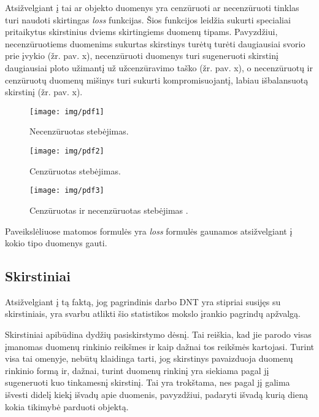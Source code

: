 \documentclass{VUMIFPSkursinis}
\begin{document}
Atsižvelgiant į tai ar objekto duomenys yra cenzūruoti ar necenzūruoti tinklas turi naudoti skirtingas \textit{loss} funkcijas. Šios funkcijos leidžia sukurti specialiai pritaikytus skirstinius dviems skirtingiems duomenų tipams. Pavyzdžiui, necenzūruotiems duomenims sukurtas skirstinys turėtų turėti daugiausiai svorio prie įvykio (žr. pav. x), necenzūruoti duomenys turi sugeneruoti skirstinį daugiausiai ploto užimantį už užcenzūravimo taško (žr. pav. x), o necenzūruotų ir cenzūruotų duomenų mišinys turi sukurti kompromisuojantį, labiau išbalansuotą skirstinį (žr. pav. x).  

\begin{figure}[H]
  \centering
  \texttt{[image: img/pdf1]}
  \caption{ Necenzūruotas stebėjimas\cite{WTTEBLOG}.}
  \label{img:pdf1}
\end{figure}


\begin{figure}[H]
  \centering
  \texttt{[image: img/pdf2]}
  \caption{ Cenzūruotas stebėjimas\cite{WTTEBLOG}.}
  \label{img:pdf2}
\end{figure}


\begin{figure}[H]
  \centering
  \texttt{[image: img/pdf3]}
  \caption{ Cenzūruotas ir necenzūruotas stebėjimas \cite{WTTEBLOG}.}
  \label{img:pdf3}
\end{figure}

Paveikslėliuose matomos formulės yra \textit{loss} formulės gaunamos atsižvelgiant į kokio tipo duomenys gauti. 



\subsection{Skirstiniai}

Atsižvelgiant į tą faktą, jog pagrindinis darbo DNT yra stipriai susijęs su skirstiniais, yra svarbu atlikti šio statistikos mokslo įrankio pagrindų apžvalgą. 

Skirstiniai apibūdina dydžių pasiskirstymo dėsnį. Tai reiškia, kad jie parodo visas įmanomas duomenų rinkinio reikšmes ir kaip dažnai tos reikšmės kartojasi. Turint visa tai omenyje, nebūtų klaidinga tarti, jog skirstinys pavaizduoja duomenų rinkinio formą ir, dažnai, turint duomenų rinkinį yra siekiama pagal jį sugeneruoti kuo tinkamesnį skirstinį. Tai yra trokštama, nes pagal jį galima išvesti didelį kiekį išvadų apie duomenis, pavyzdžiui, padaryti išvadą kurią dieną kokia tikimybė parduoti objektą.
\end{document}
